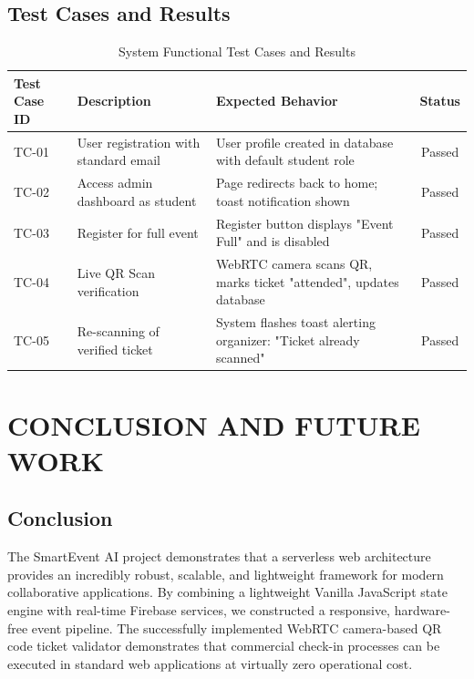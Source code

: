 \documentclass[14pt,a4paper]{extreport}
\begin{document}
\section{Test Cases and Results}
\begin{table}[H]
\centering
\begin{tabular}{|l|p{5cm}|p{5cm}|c|}
\hline
\textbf{Test Case ID} & \textbf{Description} & \textbf{Expected Behavior} & \textbf{Status} \\ \hline
TC-01 & User registration with standard email & User profile created in database with default student role & Passed \\ \hline
TC-02 & Access admin dashboard as student & Page redirects back to home; toast notification shown & Passed \\ \hline
TC-03 & Register for full event & Register button displays "Event Full" and is disabled & Passed \\ \hline
TC-04 & Live QR Scan verification & WebRTC camera scans QR, marks ticket "attended", updates database & Passed \\ \hline
TC-05 & Re-scanning of verified ticket & System flashes toast alerting organizer: "Ticket already scanned" & Passed \\ \hline
\end{tabular}
\caption{System Functional Test Cases and Results}
\end{table}

\chapter{CONCLUSION AND FUTURE WORK}
\section{Conclusion}
The SmartEvent AI project demonstrates that a serverless web architecture provides an incredibly robust, scalable, and lightweight framework for modern collaborative applications. By combining a lightweight Vanilla JavaScript state engine with real-time Firebase services, we constructed a responsive, hardware-free event pipeline. The successfully implemented WebRTC camera-based QR code ticket validator demonstrates that commercial check-in processes can be executed in standard web applications at virtually zero operational cost.
\end{document}
